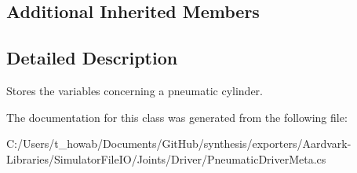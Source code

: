 \subsection*{Additional Inherited Members}


\subsection{Detailed Description}
Stores the variables concerning a pneumatic cylinder. 



The documentation for this class was generated from the following file\+:\begin{DoxyCompactItemize}
\item 
C\+:/\+Users/t\+\_\+howab/\+Documents/\+Git\+Hub/synthesis/exporters/\+Aardvark-\/\+Libraries/\+Simulator\+File\+I\+O/\+Joints/\+Driver/Pneumatic\+Driver\+Meta.\+cs\end{DoxyCompactItemize}
